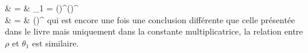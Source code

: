 \bea
	\sigma & = & \lvert {} \rvert {}\omega_{1} = \left(\right)^{}\left(\right)^{} \nonumber \\
	& = & \left(\right)^{}
\eea
qui est encore une fois une conclusion diff\'erente que celle pr\'esent\'ee dans le livre mais uniquement dans la constante multiplicatrice, la relation entre $\rho$ et $\theta_{1}$ est similaire.